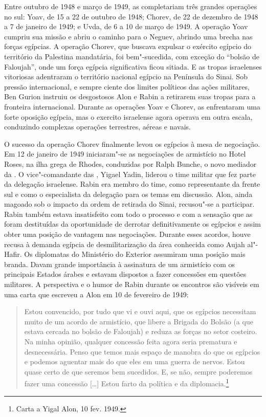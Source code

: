 Entre outubro de 1948 e março de 1949, as  completariam três grandes
operações no sul: Yoav, de 15 a 22 de outubro de 1948; Chorev, de 22 de
dezembro de 1948 a 7 de janeiro de 1949; e Uvda, de 6 a 10 de março de
1949. A operação Yoav cumpriu sua missão e abriu o caminho para o
Neguev, abrindo uma brecha nas forças egípcias. A operação Chorev, que
buscava expulsar o exército egípcio do território da Palestina
mandatária, foi bem"-sucedida, com exceção do ``bolsão de Faloujah'',
onde um força egípcia significativa ficou sitiada. E as tropas
israelenses vitoriosas adentraram o território nacional egípcio na
Península do Sinai. Sob pressão internacional, e sempre ciente dos
limites políticos das ações militares, Ben Gurion instruiu os
desgostosos Alon e Rabin a retirarem suas tropas para a fronteira
internacional. Durante as operações Yoav e Chorev, as  enfrentaram
uma forte oposição egípcia, mas o exercito israelense agora operava em
outra escala, conduzindo complexas operações terrestres, aéreas e
navais.

O sucesso da operação Chorev finalmente levou os egípcios à mesa de
negociação. Em 12 de janeiro de 1949 iniciaram"-se as negociações de
armistício no Hotel Roses, na ilha grega de Rhodes, conduzidas por Ralph
Bunche, o novo mediador da . O vice"-comandante das , Yigael Yadin,
liderou o time militar que fez parte da delegação israelense. Rabin era
membro do time, como representante da frente sul e como o especialista
da delegação para os temas em discussão. Alon, ainda magoado sob o
impacto da ordem de retirada do Sinai, recusou"-se a participar. Rabin
também estava insatisfeito com todo o processo e com a sensação que as
 foram destituídas da oportunidade de derrotar definitivamente os
egípcios e assim obter uma posição de vantagem nas negociações. Durante
esses acordos, houve recusa à demanda egípcia de desmilitarização da área
conhecida como Aujah al"-Hafir. Os diplomatas do Ministério do Exterior
assumiram uma posição mais branda. Davam grande importância à assinatura
de um armistício com os principais Estados árabes e estavam dispostos a
fazer concessões em questões militares. A perspectiva e o humor de Rabin
durante os encontros são visíveis em uma carta que escreveu a Alon em
10 de fevereiro de 1949:

\begin{quote}
Estou convencido, por tudo que vi e ouvi aqui, que os egípcios
necessitam muito de um acordo de armistício, que libere a Brigada do
Bolsão (a que estava cercada no bolsão de Faloujah) e reduza as forças
no setor costeiro. Na minha opinião, qualquer concessão feita agora
seria prematura e desnecessária. Penso que temos mais espaço de
manobra do que os egípcios e podemos aguentar mais do que eles em uma guerra
de nervos. Estou quase certo de que seremos bem sucedidos. E, se não, sempre
poderemos fazer uma concessão {[}\ldots{}{]} Estou farto da política e da
diplomacia.\footnote{Carta a Yigal Alon, 10 fev. 1949.}
\end{quote}

